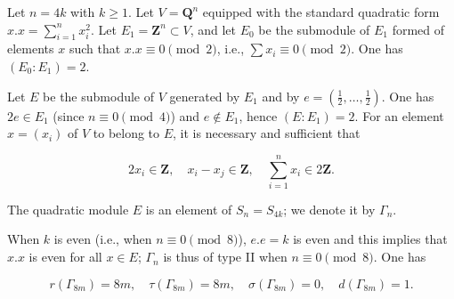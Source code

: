 Let $n = 4k$ with $k \geq 1$. Let $V = \mathbf{Q}^n$ equipped with the standard quadratic form $x.x = \sum_{i=1}^n x_i^2$. Let $E_1 = \mathbf{Z}^n \subset V$, and let $E_0$ be the submodule of $E_1$ formed of elements $x$ such that $x.x \equiv 0 \pmod{2}$, i.e., $\sum x_i \equiv 0 \pmod{2}$. One has $(E_0 : E_1) = 2$.

Let $E$ be the submodule of $V$ generated by $E_1$ and by $e = (\frac{1}{2}, \ldots, \frac{1}{2})$. One has $2e \in E_1$ (since $n \equiv 0 \pmod{4}$) and $e \notin E_1$, hence $(E : E_1) = 2$. For an element $x = (x_i)$ of $V$ to belong to $E$, it is necessary and sufficient that

$$2x_i \in \mathbf{Z}, \quad x_i - x_j \in \mathbf{Z}, \quad \sum_{i=1}^n x_i \in 2\mathbf{Z}.$$

The quadratic module $E$ is an element of $S_n = S_{4k}$; we denote it by $\Gamma_n$.

When $k$ is even (i.e., when $n \equiv 0 \pmod{8}$), $e.e = k$ is even and this implies that $x.x$ is even for all $x \in E$; $\Gamma_n$ is thus of type II when $n \equiv 0 \pmod{8}$. One has

$$r(\Gamma_{8m}) = 8m, \quad \tau(\Gamma_{8m}) = 8m, \quad \sigma(\Gamma_{8m}) = 0, \quad d(\Gamma_{8m}) = 1.$$
